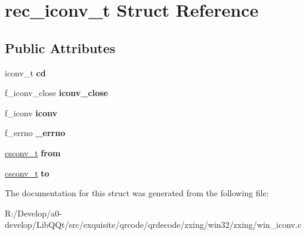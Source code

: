 \hypertarget{structrec__iconv__t}{}\section{rec\+\_\+iconv\+\_\+t Struct Reference}
\label{structrec__iconv__t}
\subsection*{Public Attributes}
\begin{DoxyCompactItemize}
\item 
\mbox{\label{structrec__iconv__t_a89819b3548d2b90ff6a80974286c098c}} 
iconv\+\_\+t {\bfseries cd}
\item 
\mbox{\label{structrec__iconv__t_a4b1c6771d68845c8d882339c701629d7}} 
f\+\_\+iconv\+\_\+close {\bfseries iconv\+\_\+close}
\item 
\mbox{\label{structrec__iconv__t_abaef7f961fe1f4737cd4f32ce8a15c79}} 
f\+\_\+iconv {\bfseries iconv}
\item 
\mbox{\label{structrec__iconv__t_a8b64708e19f62ad60e00b4fb7031207a}} 
f\+\_\+errno {\bfseries \+\_\+errno}
\item 
\mbox{\label{structrec__iconv__t_a00c99513a9d6091783297d37b88892f8}} 
\mbox{\hyperlink{structcsconv__t}{csconv\+\_\+t}} {\bfseries from}
\item 
\mbox{\label{structrec__iconv__t_ab239c0705dd676d3fbc416f54e2f5270}} 
\mbox{\hyperlink{structcsconv__t}{csconv\+\_\+t}} {\bfseries to}
\end{DoxyCompactItemize}


The documentation for this struct was generated from the following file\+:\begin{DoxyCompactItemize}
\item 
R\+:/\+Develop/a0-\/develop/\+Lib\+Q\+Qt/src/exquisite/qrcode/qrdecode/zxing/win32/zxing/win\+\_\+iconv.\+c\end{DoxyCompactItemize}

